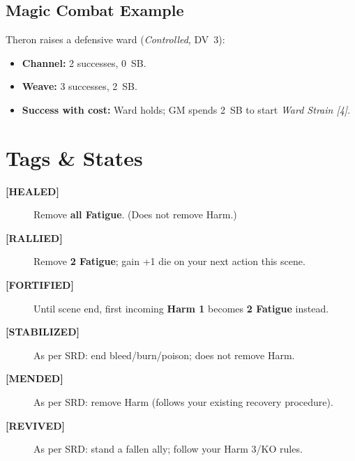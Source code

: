 \subsection{Magic Combat Example}
\label{subsec:magic-example}

Theron raises a defensive ward (\textit{Controlled}, DV~3):
\begin{itemize}
  \item \textbf{Channel:} 2 successes, 0~SB.
  \item \textbf{Weave:} 3 successes, 2~SB.
  \item \textbf{Success with cost:} Ward holds; GM spends 2~SB to start \emph{Ward Strain [4]}.
\end{itemize}

\section{Tags \& States}
\label{sec:tags-states-ref}

\begin{description}
  \item[\textbf{[HEALED]}] Remove \textbf{all Fatigue}. (Does not remove Harm.)
  \item[\textbf{[RALLIED]}] Remove \textbf{2 Fatigue}; gain +1 die on your next action this scene.
  \item[\textbf{[FORTIFIED]}] Until scene end, first incoming \textbf{Harm 1} becomes \textbf{2 Fatigue} instead.
  \item[\textbf{[STABILIZED]}] As per SRD: end bleed/burn/poison; does not remove Harm.
  \item[\textbf{[MENDED]}] As per SRD: remove Harm (follows your existing recovery procedure).
  \item[\textbf{[REVIVED]}] As per SRD: stand a fallen ally; follow your Harm 3/KO rules.
\end{description}
